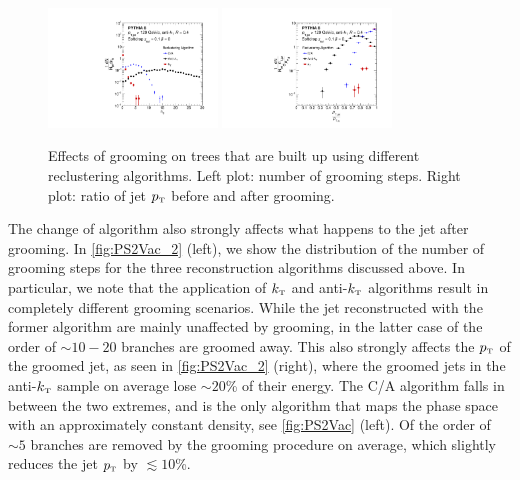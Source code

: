\begin{figure}[ht]
\centering
\includegraphics[width=0.4\textwidth]{figures/SDAlgorithms/ndropClusteringComp.pdf}%
\includegraphics[width=0.4\textwidth]{figures/SDAlgorithms/ptratioClusteringComp.pdf}%
\caption{Effects of grooming on trees that are built up using different reclustering algorithms. Left plot: number of grooming steps. Right plot: ratio of jet $p_{\text{\tiny T}}$ before and after grooming.
}
\label{fig:PS2Vac_2}
\end{figure}
The change of algorithm also strongly affects what happens to the jet after grooming. In \autoref{fig:PS2Vac_2} (left), we show the distribution of the number of grooming steps for the three reconstruction algorithms discussed above. In particular, we note that the application of $k_{\text{\tiny T}}$ and anti-$k_{\text{\tiny T}}$ algorithms result in completely different grooming scenarios. While the jet reconstructed with the former algorithm are mainly unaffected by grooming, in the latter case of the order of $\sim 10-20$ branches are groomed away. This also strongly affects the $p_{\text{\tiny T}}$ of the groomed jet, as seen in \autoref{fig:PS2Vac_2} (right), where the groomed jets in the anti-$k_{\text{\tiny T}}$ sample on average lose $\sim 20$\% of their energy. The C/A algorithm falls in between the two extremes, and is the only algorithm that maps the phase space with an approximately constant density, see \autoref{fig:PS2Vac} (left). Of the order of $\sim 5$ branches are removed by the grooming procedure on average, which slightly reduces the jet $p_{\text{\tiny T}}$ by $\lesssim 10$\%.

